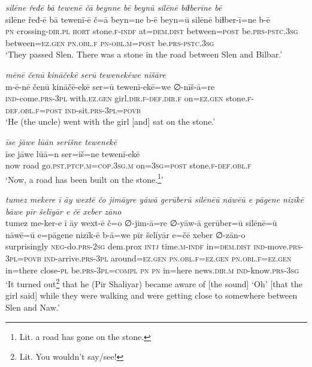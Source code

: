 \ea \label{ŽP.167}
\textit{silēne řeđē bā tewenē čā beynne bē beynū silēnē biɫberīne bē} \\ 
\gll silēne řeđ-ē bā tewenī-ē č=ā beyn=ne b-ē beyn=ū silēnē biɫber-ī=ne b-ē \\ 
 \textsc{pn} crossing\textsc{-dir}\textsc{.pl} \textsc{hort} stone\textsc{.f}\textsc{-indf} at=\textsc{dem.dist} between\textsc{=\textsc{post}} be\textsc{.prs}\textsc{-pstc}\textsc{.3sg} between\textsc{\textsc{=ez.gen}} \textsc{pn}\textsc{.obl}\textsc{.f} \textsc{pn}\textsc{-obl}\textsc{.m}\textsc{=\textsc{post}} be\textsc{.prs}\textsc{-pstc}\textsc{.3sg} \\ 
\glt `They passed Slen. There was a stone in the road between Slen and Bilbar.'
\z 
 
\ea \label{ŽP.169}
\textit{mēnē čenū kināčekē serū tewenekēwe nīšāre} \\ 
\gll m-ē-nē čenū kināčē-ekē ser=ū tewenī-ekē=we ∅-nīš-ā=re \\ 
 \textsc{ind-}come\textsc{.prs}\textsc{-3pl} with\textsc{.ez.gen} girl\textsc{.dir}\textsc{.f}\textsc{-def}\textsc{.dir}\textsc{.f} on\textsc{\textsc{=ez.gen}} stone\textsc{.f}\textsc{-def}\textsc{.obl}\textsc{.f}\textsc{=\textsc{post}} \textsc{ind-}sit\textsc{.prs}\textsc{-3pl}\textsc{=\textsc{povb}} \\ 
\glt `He (the uncle) went with the girl [and] sat on the stone.'
\z 
 
\ea \label{ŽP.170}
\textit{īse jāwe lūān serišne tewenekē} \\ 
\gll īse jāwe lūā=n ser=iš=ne tewenī-ekē \\ 
 now road go\textsc{.pst}\textsc{.ptcp}\textsc{.m}\textsc{=cop}\textsc{.3sg}\textsc{.m} on\textsc{=3sg}\textsc{=\textsc{post}} stone\textsc{.f}\textsc{-def}\textsc{.obl}\textsc{.f} \\ 
\glt `Now, a road has been built on the stone.\footnote{Lit. a road has gone on the stone.}'
\z 
 
\ea \label{ŽP.175}
\textit{tumez mekere ī āy wextē čo jimāyre yāwā gerūberū silēnēū nāwēū e pāgene nizīkē bāwe pīr šelīyār e čē xeber zāno} \\ 
\gll tumez me-ker-e ī āy wext-ē č=o ∅-jim-ā=re ∅-yāw-ā gerūber=ū silēnē=ū nāwē=ū e=pāgene nizīk-ē b-ā=we pīr šelīyār e=čē xeber ∅-zān-o \\ 
 surprisingly \textsc{neg-}do\textsc{.prs}-\textsc{2sg} dem.prox \textsc{intj} time\textsc{.m}\textsc{-indf} in=\textsc{dem.dist} \textsc{ind-}move\textsc{.prs}\textsc{-3pl}\textsc{=\textsc{povb}} \textsc{ind-}arrive\textsc{.prs}\textsc{-3pl} around\textsc{\textsc{=ez.gen}} \textsc{pn}\textsc{.obl}\textsc{.f}\textsc{\textsc{=ez.gen}} \textsc{pn}\textsc{.obl}\textsc{.f}\textsc{\textsc{=ez.gen}} in=there close\textsc{\textsc{-pl}} be\textsc{.prs}\textsc{-3pl}\textsc{=compl} \textsc{pn} \textsc{pn} in=here news\textsc{.dir}\textsc{.m} \textsc{ind-}know\textsc{.prs}\textsc{-3sg} \\ 
\glt `It turned out\footnote{Lit. You wouldn’t say/see!} that he (Pir Shaliyar) became aware of [the sound] ‘Oh’ [that the girl said] while they were walking and were getting close to somewhere between Slen and Naw.'
\z 
 
